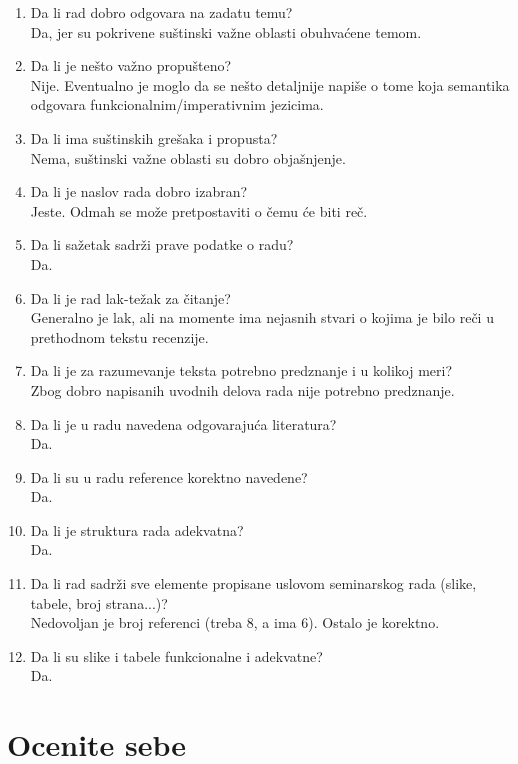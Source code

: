 \documentclass[a4paper]{report}
\begin{document}
\begin{enumerate}
\item Da li rad dobro odgovara na zadatu temu?\\
{Da, jer su pokrivene suštinski važne oblasti obuhvaćene temom.}
\item Da li je nešto važno propušteno?\\
{Nije. Eventualno je moglo da se nešto detaljnije napiše o tome koja semantika odgovara funkcionalnim/imperativnim jezicima.}
\item Da li ima suštinskih grešaka i propusta?\\
{Nema, suštinski važne oblasti su dobro objašnjenje.}
\item Da li je naslov rada dobro izabran?\\
{Jeste. Odmah se može pretpostaviti o čemu će biti reč.}
\item Da li sažetak sadrži prave podatke o radu?\\
{Da.}
\item Da li je rad lak-težak za čitanje?\\
{Generalno je lak, ali na momente ima nejasnih stvari o kojima je bilo reči u prethodnom tekstu recenzije.}
\item Da li je za razumevanje teksta potrebno predznanje i u kolikoj meri?\\
{Zbog dobro napisanih uvodnih delova rada nije potrebno predznanje.}
\item Da li je u radu navedena odgovarajuća literatura?\\
{Da.}
\item Da li su u radu reference korektno navedene?\\
{Da.}
\item Da li je struktura rada adekvatna?\\
{Da.}
\item Da li rad sadrži sve elemente propisane uslovom seminarskog rada (slike, tabele, broj strana...)?\\
{Nedovoljan je broj referenci (treba 8, a ima 6). Ostalo je korektno.}
\item Da li su slike i tabele funkcionalne i adekvatne?\\
{Da.}
\end{enumerate}

\section{Ocenite sebe}
\end{document}
